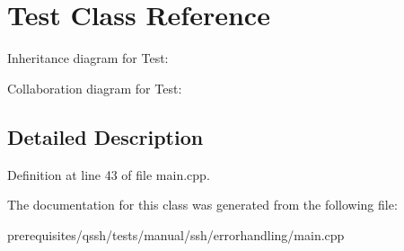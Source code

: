 \hypertarget{class_test}{}\section{Test Class Reference}
\label{class_test}


Inheritance diagram for Test\+:


Collaboration diagram for Test\+:


\subsection{Detailed Description}


Definition at line 43 of file main.\+cpp.



The documentation for this class was generated from the following file\+:\begin{DoxyCompactItemize}
\item 
prerequisites/qssh/tests/manual/ssh/errorhandling/main.\+cpp\end{DoxyCompactItemize}
